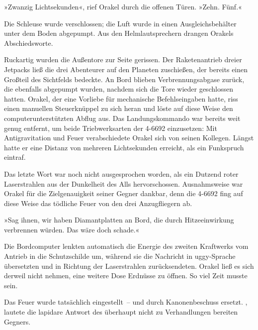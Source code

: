 »Zwanzig Lichtsekunden«, rief Orakel durch die offenen Türen. »Zehn. Fünf.«

Die Schleuse wurde verschlossen; die Luft wurde in einen Ausgleichsbehälter unter dem Boden abgepumpt. Aus den Helmlautsprechern drangen Orakels Abschiedsworte.


Ruckartig wurden die Außentore zur Seite gerissen. Der Raketenantrieb dreier Jetpacks ließ die drei Abenteurer auf den Planeten zuschießen, der bereits einen Großteil des Sichtfelds bedeckte. An Bord blieben Verbrennungsabgase zurück, die ebenfalls abgepumpt wurden, nachdem sich die Tore wieder geschlossen hatten. Orakel, der eine Vorliebe für mechanische Befehlseingaben hatte, riss einen manuellen Steuerknüppel zu sich heran und löste auf diese Weise den computerunterstützten Abflug aus. Das Landungskommando war bereits weit genug entfernt, um beide Triebwerksarten der 4-6692 einzusetzen: Mit Antigravitation und Feuer verabschiedete Orakel sich von seinen Kollegen. Längst hatte er eine Distanz von mehreren Lichtsekunden erreicht, als ein Funkspruch eintraf.


Das letzte Wort war noch nicht ausgesprochen worden, als ein Dutzend roter Laserstrahlen aus der Dunkelheit des Alls hervorschossen. Ausnahmsweise war Orakel für die Zielgenauigkeit seiner Gegner dankbar, denn die 4-6692 fing auf diese Weise das tödliche Feuer von den drei Anzugfliegern ab.

»Sag ihnen, wir haben Diamantplatten an Bord, die durch Hitzeeinwirkung verbrennen würden. Das wäre doch schade.«

Die Bordcomputer lenkten automatisch die Energie des zweiten Kraftwerks vom Antrieb in die Schutzschilde um, während sie die Nachricht in uggy-Sprache übersetzten und in Richtung der Laserstrahlen zurücksendeten. Orakel ließ es sich derweil nicht nehmen, eine weitere Dose Erdnüsse zu öffnen. So viel Zeit musste sein.

Das Feuer wurde tatsächlich eingestellt~– und durch Kanonenbeschuss ersetzt. , lautete die lapidare Antwort des überhaupt nicht zu Verhandlungen bereiten Gegners.

